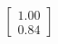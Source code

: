 \documentclass[preview]{standalone}
\begin{document}
\begin{align*}
\begin{bmatrix} 1.00 \\ 0.84 \end{bmatrix}
\end{align*}
\end{document}

